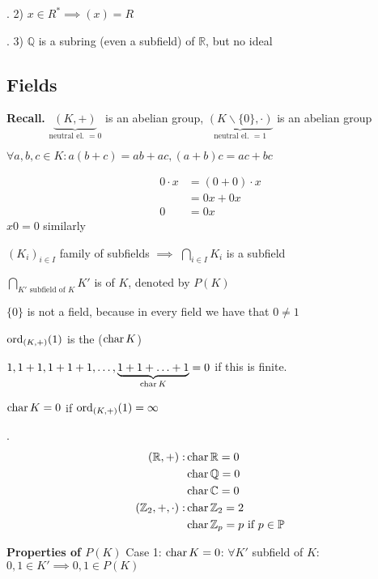 \Example.
2) $x\in R^{*} \implies (x) = R$

\Example.
3) $\mathbb{Q}$ is a subring (even a subfield) of $\mathbb{R}$, but no ideal

\subsection{Fields}

\textbf{Recall.}
$\underbrace{(K,+)}_{\text{neutral el. }= 0}$ is an abelian group, $\underbrace{(K\backslash \{0\}, \cdot)}_{\text{neutral el. }= 1}$ is an abelian group

$\forall a,b,c \in K: a(b+c) = ab+ac, (a+b)c = ac+bc$

\begin{align*}
  0\cdot x &= (0+0) \cdot x \\
           &= 0x + 0x \\
         0 &= 0x
\end{align*}
$x0 = 0$ similarly

$(K_i)_{i\in I}$ family of subfields $\implies$ $\bigcap_{i\in I} K_i$ is a subfield

\begin{definition}
  $\bigcap_{K' \text{ subfield of $K$}} K'$ is  of $K$, denoted by $P(K)$
\end{definition}

$\{0\}$ is not a field, because in every field we have that $0 \neq 1$

\begin{definition}
  $\operatorname{ord}_{(K,+)} (1)$ is the  ($\operatorname{char} K$)
\end{definition}

$1,1+1, 1+1+1, \ldots, \underbrace{1+1+ \ldots +1}_{\operatorname{char} K} = 0$ if this is finite.

$\operatorname{char} K = 0$ if $\operatorname{ord}_{(K,+)} (1) = \infty$

\Example.
\begin{align*}
  (\mathbb{R}, +): &\operatorname{char} \mathbb{R} = 0\\
  &\operatorname{char} \mathbb{Q} = 0\\
  &\operatorname{char} \mathbb{C} = 0\\
  (\mathbb{Z}_2, +, \cdot): &\operatorname{char} \mathbb{Z}_2 = 2\\
  &\operatorname{char} \mathbb{Z}_p = p \text{ if } p \in \mathbb{P}
\end{align*}

\textbf{Properties of $P(K)$}
Case 1:
$\operatorname{char} K=0$:
$\forall K'$ subfield of $K$: $0,1 \in K' \implies 0,1 \in P(K)$

